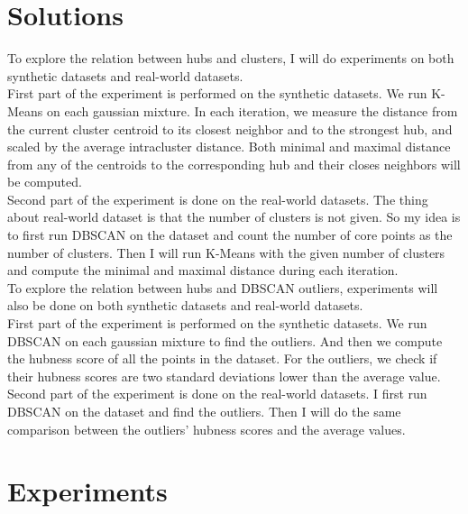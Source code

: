 \documentclass[11pt]{article}
\begin{document}
\section{Solutions}
To explore the relation between hubs and clusters, I will do experiments on both synthetic datasets and real-world datasets.\\
First part of the experiment is performed on the synthetic datasets. We run K-Means on each gaussian mixture. In each iteration, we measure the distance from the current cluster centroid to its closest neighbor and to the strongest hub, and scaled by the average intracluster distance. Both minimal and maximal distance from any of the centroids to the corresponding hub and their closes neighbors will be computed.\\
Second part of the experiment is done on the real-world datasets. The thing about real-world dataset is that the number of clusters is not given. So my idea is to first run DBSCAN on the dataset and count the number of core points as the number of clusters. Then I will run K-Means with the given number of clusters and compute the minimal and maximal distance during each iteration.\\
To explore the relation between hubs and DBSCAN outliers, experiments will also be done on both synthetic datasets and real-world datasets.\\
First part of the experiment is performed on the synthetic datasets. We run DBSCAN on each gaussian mixture to find the outliers. And then we compute the hubness score of all the points in the dataset. For the outliers, we check if their hubness scores are two standard deviations lower than the average value.\\
Second part of the experiment is done on the real-world datasets. I first run DBSCAN on the dataset and find the outliers. Then I will do the same comparison between the outliers’ hubness scores and the average values.\\

\section{Experiments}
\end{document}
